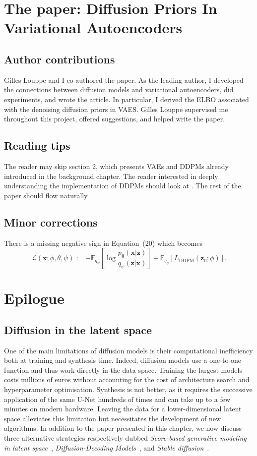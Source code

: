 \section{The paper: Diffusion Priors In Variational Autoencoders}

\subsection{Author contributions}
Gilles Louppe and I co-authored the paper. As the leading author, I developed the connections between diffusion models and variational autoencoders, did experiments, and wrote the article. In particular, I derived the ELBO associated with the denoising diffusion priors in VAES. Gilles Louppe supervised me throughout this project, offered suggestions, and helped write the paper.

\subsection{Reading tips}
The reader may skip section 2, which presents VAEs and DDPMs already introduced in the background chapter. The reader interested in deeply understanding the implementation of DDPMs should look at \citet{ho_denoising_2020}. The rest of the paper should flow naturally.

\subsection{Minor corrections}
There is a missing negative sign in Equation~(20) which becomes
$$\mathcal{L}(\mathbf{x}; \phi, \theta, \psi) := -\mathbb{E}_{q_{\psi}}\left[\log \frac{p_{\mathbf{\theta}}(\mathbf{x}|\mathbf{z})}{q_{\psi}(\mathbf{z}|\mathbf{x})} \right] + \mathbb{E}_{q_{\psi}}\left[ L_{\text{DDPM}}(\mathbf{z}_0; \phi)\right].$$



\section{Epilogue}
\subsection{Diffusion in the latent space}
One of the main limitations of diffusion models is their computational inefficiency both at training and synthesis time. Indeed, diffusion models use a one-to-one function and thus work directly in the data space. Training the largest models costs millions of euros without accounting for the cost of architecture search and hyperparameter optimisation. Synthesis is not better, as it requires the successive application of the same U-Net hundreds of times and can take up to a few minutes on modern hardware. Leaving the data for a lower-dimensional latent space alleviates this limitation but necessitates the development of new algorithms. In addition to the paper presented in this chapter, we now discuss three alternative strategies respectively dubbed \textit{Score-based generative modeling in latent space}~\citep{vahdat2021score}, \textit{Diffusion-Decoding Models}~\citep{sinha2021d2c}, and \textit{Stable diffusion}~\citep{rombach2022high}.

